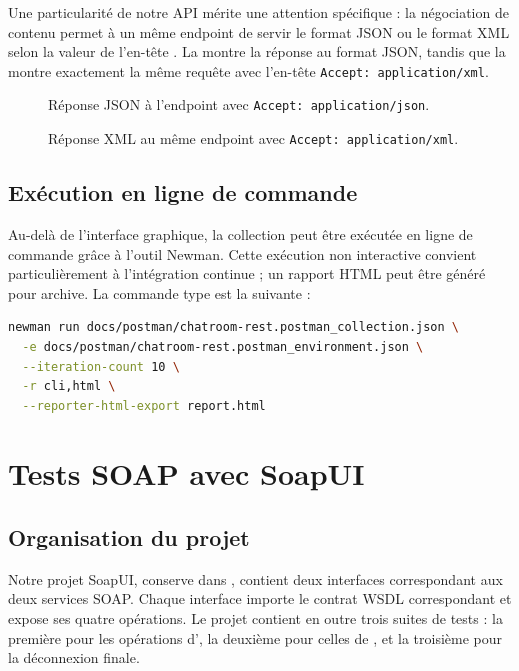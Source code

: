 Une particularité de notre API mérite une attention spécifique : la négociation de contenu permet à un même endpoint de servir le format JSON ou le format XML selon la valeur de l'en-tête . La  montre la réponse au format JSON, tandis que la  montre exactement la même requête avec l'en-tête \texttt{Accept: application/xml}.

\begin{figure}[ht]
  \centering
  \fbox{\rule{0pt}{6cm}\rule{12cm}{0pt}}
  \caption{Réponse JSON à l'endpoint  avec \texttt{Accept: application/json}.}
  \label{fig:postman-json}
\end{figure}

\begin{figure}[ht]
  \centering
  \fbox{\rule{0pt}{6cm}\rule{12cm}{0pt}}
  \caption{Réponse XML au même endpoint avec \texttt{Accept: application/xml}.}
  \label{fig:postman-xml}
\end{figure}

\subsection{Exécution en ligne de commande}

Au-delà de l'interface graphique, la collection peut être exécutée en ligne de commande grâce à l'outil Newman. Cette exécution non interactive convient particulièrement à l'intégration continue ; un rapport HTML peut être généré pour archive. La commande type est la suivante :

\begin{lstlisting}[language=bash, caption={Exécution de la collection via Newman.}]
newman run docs/postman/chatroom-rest.postman_collection.json \
  -e docs/postman/chatroom-rest.postman_environment.json \
  --iteration-count 10 \
  -r cli,html \
  --reporter-html-export report.html
\end{lstlisting}

\section{Tests SOAP avec SoapUI}

\subsection{Organisation du projet}

Notre projet SoapUI, conserve dans , contient deux interfaces correspondant aux deux services SOAP. Chaque interface importe le contrat WSDL correspondant et expose ses quatre opérations. Le projet contient en outre trois suites de tests : la première pour les opérations d', la deuxième pour celles de , et la troisième pour la déconnexion finale.

